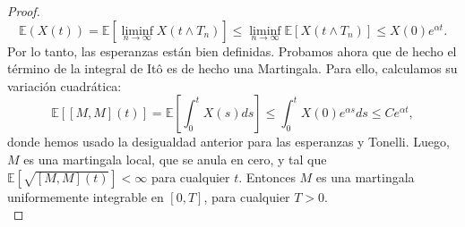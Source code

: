 \documentclass[letterpaper]{article}
\renewcommand{\to}{\rightarrow}
\newcommand{\E}{\mathbb{E}}
\newcommand{\1}{\mathds{1}}
\theoremstyle{definition}
\theoremstyle{definition}
\theoremstyle{definition}
\theoremstyle{definition}
\theoremstyle{definition}
\begin{document}
\begin{proof}
    \[
        \E(X(t))=\E\left[\liminf_{n\to\infty}X(t\wedge T_n)\right]\leq \liminf_{n\to\infty}\E\left[X(t\wedge T_n)\right]\leq X(0)e^{\alpha t}.
    \]    
    Por lo tanto, las esperanzas están bien definidas. Probamos ahora que de hecho el término de la integral de Itô es 
    de hecho una Martingala. Para ello, calculamos su variación cuadrática:
    \[
        \E\left[[M,M](t)\right]=\E\left[\int_{0}^{t}X(s)ds\right]\leq \int_{0}^{t}X(0)e^{\alpha s}ds\leq Ce^{\alpha t},
    \]
    donde hemos usado la desigualdad anterior para las esperanzas y Tonelli. Luego, $M$ es una martingala local, que 
    se anula en cero, y tal que $\E\left[\sqrt{[M,M](t)}\right]<\infty$ para cualquier $t$.
    Entonces $M$ es una martingala uniformemente integrable en $[0,T]$, para cualquier $T>0$.\\


\end{proof}
\end{document}
